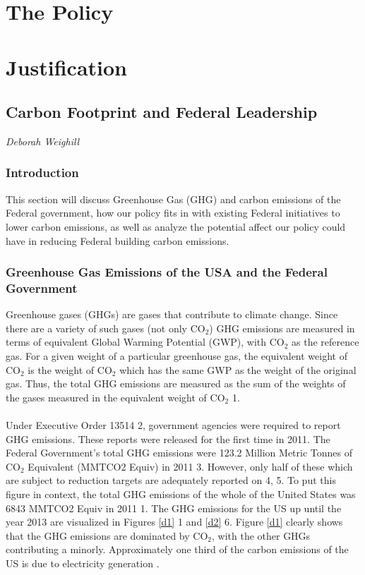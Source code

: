 \documentclass[10pt]{book} %
\begin{document}
\chapter{The Policy}

\chapter{Justification}

\section{Carbon Footprint and Federal Leadership}
\textit{Deborah Weighill}

\subsection{Introduction}
This section will discuss Greenhouse Gas (GHG) and carbon emissions of the Federal government, how our policy fits in with existing Federal initiatives to lower carbon emissions, as well as analyze the potential affect our policy could have in reducing Federal building carbon emissions.

\subsection{Greenhouse Gas Emissions of the USA and the Federal Government}
Greenhouse gases (GHGs) are gases that contribute to climate change. Since there are a variety of such gases (not only CO$_{2}$) GHG emissions are measured in terms of equivalent Global Warming Potential (GWP), with CO$_{2}$ as the reference gas. For a given weight of a particular greenhouse gas, the equivalent weight of CO$_{2}$ is the weight of CO$_{2}$ which has the same GWP as the weight of the original gas. Thus, the total GHG emissions are measured as the sum of the weights of the gases measured in the equivalent weight of CO$_{2}$ \cite{deb}{1}.
\\\\
\noindent Under Executive Order 13514 \cite{deb}{2}, government agencies were required to report GHG emissions. These reports were released for the first time in 2011. The Federal Government's total GHG emissions were 123.2 Million Metric Tonnes of CO$_{2}$ Equivalent (MMTCO2 Equiv) in 2011 \cite{deb}{3}. However, only half of these which are subject to reduction targets are adequately reported on \cite{deb}{4, 5}. To put this figure in context, the total GHG emissions of the whole of the United States was 6843 MMTCO2 Equiv in 2011 \cite{deb}{1}. The GHG emissions for the US up until the year 2013 are visualized in Figures \ref{d1} \cite{deb}{1} and \ref{d2} \cite{deb}{6}. Figure \ref{d1} clearly shows that the GHG emissions are dominated by CO$_{2}$, with the other GHGs contributing a minorly. Approximately one third of the carbon emissions of the US is due to electricity generation \cite{newfigsepa2}.
\end{document}
